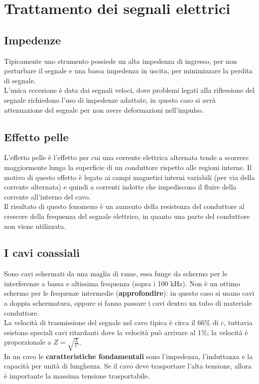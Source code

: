 \chapter{Trattamento dei segnali elettrici}
\section{Impedenze}
Tipicamente uno strumento possiede un alta impedenza di ingresso, per non perturbare il segnale e una bassa impedenza in uscita,
per minimizzare la perdita di segnale.\\
L'unica eccezione \`e data dai segnali veloci, dove problemi legati alla riflessione del segnale richiedono l'uso di impedenze adattate,
in questo caso si avr\`a attenuazione del segnale per non avere deformazioni nell'impulso.
\section{Effetto pelle}
L'effetto pelle \`e l'effetto per cui una corrente elettrica alternata tende a scorrere maggiormente lungo la superficie di un conduttore rispetto
alle regioni interne.
Il motivo di questo effetto \`e legato ai campi magnetici interni variabili (per via della corrente alternata) e quindi a correnti
indotte che impediscono il fluire della corrente all'interno del cavo.\\
Il risultato di questo fenomeno \`e un aumento della resistenza del conduttore al crescere della frequenza del segnale elettrico,
in quanto una parte del conduttore non viene utilizzata.
\section{I cavi coassiali}
Sono cavi schermati da una maglia di rame, essa funge da schermo per le interferenze a bassa e altissima frequenza (sopra i 100 kHz).
Non \`e un ottimo schermo per le frequenze intermedie (\textbf{approfondire}): in questo caso si usano cavi a doppia schermatura,
oppure si fanno passare i cavi dentro un tubo di materiale conduttore.\\
La velocit\`a di trasmissione del segnale nel cavo tipica \`e circa il 66\% di $c$, tuttavia esistono speciali cavi ritardanti dove
la velocit\`a pu\`o arrivare al 1\%; la velocit\`a \`e proporzionale a $Z = \sqrt{\frac{L}{C}}$.\\
In un cavo le \textbf{caratteristiche fondamentali} sono l'impedenza, l'induttanza e la capacit\`a per unit\`a di lunghezza.
Se il cavo deve trasportare l'alta tensione, allora \`e importante la massima tensione trasportabile.\\

